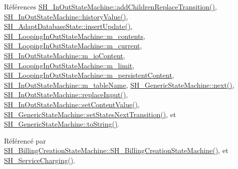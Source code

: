 Références \hyperlink{classSH__InOutStateMachine_ae0f3b4622d2c70884bb224dee86e95c0}{S\-H\-\_\-\-In\-Out\-State\-Machine\-::add\-Children\-Replace\-Transition()}, \hyperlink{classSH__InOutStateMachine_af71bfdb3b59b7bf2763588b513b4205f}{S\-H\-\_\-\-In\-Out\-State\-Machine\-::history\-Value()}, \hyperlink{classSH__AdaptDatabaseState_a037db544ea05f42d21fcbdda758839fe}{S\-H\-\_\-\-Adapt\-Database\-State\-::insert\-Update()}, \hyperlink{classSH__LoopingInOutStateMachine_a145e625dcb4d5438bd9c761eeb9425d4}{S\-H\-\_\-\-Looping\-In\-Out\-State\-Machine\-::m\-\_\-contents}, \hyperlink{classSH__LoopingInOutStateMachine_af64f9f28a1b8e82bd9ee5f4b96a7c82e}{S\-H\-\_\-\-Looping\-In\-Out\-State\-Machine\-::m\-\_\-current}, \hyperlink{classSH__InOutStateMachine_a8cfbc27eef057bf37b7711bdfef2077e}{S\-H\-\_\-\-In\-Out\-State\-Machine\-::m\-\_\-io\-Content}, \hyperlink{classSH__LoopingInOutStateMachine_a818a60d3691fcac11323ad114c309dcb}{S\-H\-\_\-\-Looping\-In\-Out\-State\-Machine\-::m\-\_\-limit}, \hyperlink{classSH__LoopingInOutStateMachine_a4e9ea23cf1eecbe26c6ed93b290a9115}{S\-H\-\_\-\-Looping\-In\-Out\-State\-Machine\-::m\-\_\-persistent\-Content}, \hyperlink{classSH__InOutStateMachine_aa009eecc5ab6181358faafb5996b6006}{S\-H\-\_\-\-In\-Out\-State\-Machine\-::m\-\_\-table\-Name}, \hyperlink{classSH__GenericStateMachine_af4771d31d87951c997fba1633c2d67f6}{S\-H\-\_\-\-Generic\-State\-Machine\-::next()}, \hyperlink{classSH__InOutStateMachine_a9fa5db44086de2576c812f631aa4f60a}{S\-H\-\_\-\-In\-Out\-State\-Machine\-::replace\-Input()}, \hyperlink{classSH__InOutStateMachine_a9ab1534306b2bdb62743d4bcefe40c17}{S\-H\-\_\-\-In\-Out\-State\-Machine\-::set\-Content\-Value()}, \hyperlink{classSH__GenericStateMachine_a136a71cd1f2de1322ac7694db25f0b53}{S\-H\-\_\-\-Generic\-State\-Machine\-::set\-States\-Next\-Transition()}, et \hyperlink{classSH__GenericStateMachine_a85c0c1c9d258ae991f84667412fa47cd}{S\-H\-\_\-\-Generic\-State\-Machine\-::to\-String()}.



Référencé par \hyperlink{classSH__BillingCreationStateMachine_ad62b77fa4aeafe200056ff3974562f83}{S\-H\-\_\-\-Billing\-Creation\-State\-Machine\-::\-S\-H\-\_\-\-Billing\-Creation\-State\-Machine()}, et \hyperlink{classSH__ServiceCharging_afa5273d046049b1c2b020a6a19a8290b}{S\-H\-\_\-\-Service\-Charging()}.


